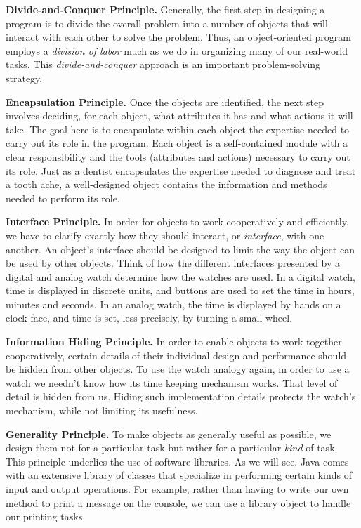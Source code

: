 \begin{BL}
\item {\bf Divide-and-Conquer Principle.}  Generally, the first step
in designing a program is to divide the overall problem into a number
of objects that will interact with each other to solve the
problem. Thus, an object-oriented program employs a {\em division of
labor} much as we do in organizing many of our real-world tasks. This
{\em divide-and-conquer} approach is an important problem-solving
strategy.

\item {\bf Encapsulation Principle.} Once the objects are identified,
the next step involves deciding, for each object, what attributes it
has and what actions it will take.  The goal here is to encapsulate
within each object the expertise needed to carry out its role in the
program.  Each object is a self-contained module with a clear
responsibility and the tools (attributes and actions) necessary to
carry out its role. Just as a dentist encapsulates the expertise
needed to diagnose and treat a tooth ache, a well-designed object
contains the information and methods needed to perform its role.

\item {\bf Interface Principle.} In order for objects to work
cooperatively and efficiently, we have to clarify exactly how they
should interact, or {\em interface}, with one another.  An object's
interface should be designed to limit the way the object can be used
by other objects. Think of how the different interfaces presented by a
digital and analog watch determine how the watches are used.  In a
digital watch, time is displayed in discrete units, and buttons are
used to set the time in hours, minutes and seconds. In an analog
watch, the time is displayed by hands on a clock face, and time is
set, less precisely, by turning a small wheel.

\item {\bf Information Hiding Principle.} In order to enable objects
to work together cooperatively, certain details of their individual
design and performance should be hidden from other objects. To use the
watch analogy again, in order to use a watch we needn't know how its
time keeping mechanism works. That level of detail is hidden from us.
Hiding such implementation details protects the watch's mechanism, while
not limiting its usefulness. 

\item {\bf Generality Principle.}  To make objects as generally useful
as possible, we design them not for a particular task but rather for a
particular {\em kind} of task.  This principle underlies the use of
software libraries.  As we will see, Java comes with an extensive
library of classes that specialize in performing certain kinds of
input and output operations. For example, rather than having to write
our own method to print a message on the console, we can use a library
object to handle our printing tasks.


\end{BL}
